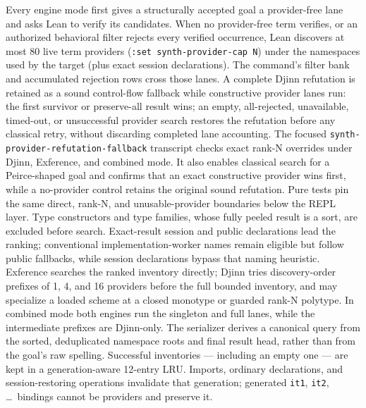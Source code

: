 \documentclass[11pt,oneside]{article}
\newcommand{\code}[1]{\texttt{#1}}
\begin{document}
Every engine mode first gives a structurally accepted goal a
provider-free lane and asks Lean to verify its candidates. When no
provider-free term verifies, or an authorized behavioral filter rejects every
verified occurrence, Lean discovers at most 80 live term providers
(\code{:set synth-provider-cap N}) under the
namespaces used by the target (plus exact session declarations). The command's
filter bank and accumulated rejection rows cross those lanes. A complete Djinn
refutation is retained as a sound control-flow fallback while constructive
provider lanes run: the first survivor or preserve-all result wins; an empty,
all-rejected, unavailable, timed-out, or unsuccessful provider search restores
the refutation before any classical retry, without discarding completed lane
accounting.
The focused \code{synth-provider-refutation-fallback} transcript checks exact
rank-N overrides under Djinn, Exference, and combined mode. It also enables
classical search for a Peirce-shaped goal and confirms that an exact
constructive provider wins first, while a no-provider control retains the
original sound refutation. Pure tests pin the same direct, rank-N, and
unusable-provider boundaries below the REPL layer.
Type constructors and type families, whose fully peeled result is a
sort, are excluded before search. Exact-result session and public
declarations lead the ranking;
conventional implementation-worker names remain eligible but follow
public fallbacks, while session declarations bypass that naming
heuristic. Exference searches the ranked inventory directly; Djinn
tries discovery-order prefixes of 1, 4, and 16 providers before the full
bounded inventory, and may specialize a loaded scheme at a closed
monotype or guarded rank-N polytype.  In combined mode both engines run
the singleton and full lanes, while the intermediate prefixes are
Djinn-only. The serializer derives a canonical
query from the
sorted, deduplicated namespace roots and final result head, rather than
from the goal's raw spelling. Successful inventories --- including an
empty one --- are kept in a generation-aware 12-entry LRU. Imports,
ordinary declarations, and session-restoring operations invalidate that
generation; generated \code{it1}, \code{it2}, \dots\ bindings cannot be
providers and preserve it.
\end{document}
